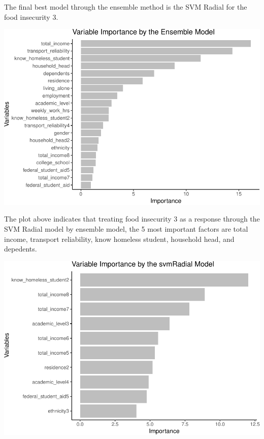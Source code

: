 \documentclass[
  10pt,
]{article}
\begin{document}
The final best model through the ensemble method is the SVM Radial for the food insecurity 3.\\

\begin{center}\includegraphics{final_phase2_report_files/figure-latex/unnamed-chunk-27-1} \end{center}

The plot above indicates that treating food insecurity 3 as a response through the SVM Radial model by ensemble model, the 5 most important factors are total income, transport reliability, know homeless student, household head, and depedents.\\

\begin{center}\includegraphics{final_phase2_report_files/figure-latex/unnamed-chunk-28-1} \end{center}
\end{document}
